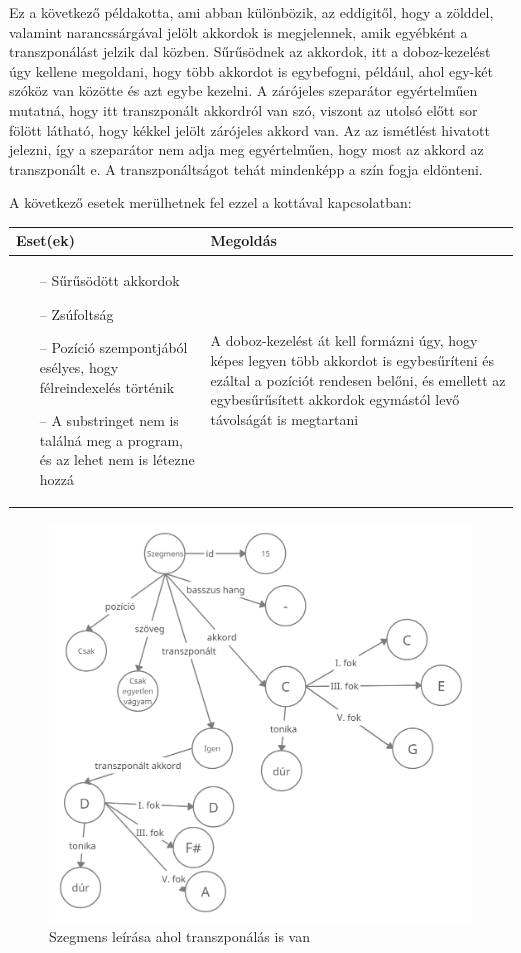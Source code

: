 Ez a következő példakotta, ami abban különbözik, az eddigitől, hogy a zölddel, valamint narancssárgával jelölt akkordok is megjelennek, amik egyébként a transzponálást jelzik dal közben. Sűrűsödnek az akkordok, itt a doboz-kezelést úgy kellene megoldani, hogy több akkordot is egybefogni, például, ahol egy-két szóköz van közötte és azt egybe kezelni. A zárójeles szeparátor egyértelműen mutatná, hogy itt transzponált akkordról van szó, viszont az utolsó előtt sor fölött látható, hogy kékkel jelölt zárójeles akkord van. Az az ismétlést hivatott jelezni, így a szeparátor nem adja meg egyértelműen, hogy most az akkord az transzponált e. A transzponáltságot tehát mindenképp a szín fogja eldönteni.

A következő esetek merülhetnek fel ezzel a kottával kapcsolatban:
\begin{center}
	\begin{tabular}{ |p{7cm}|p{7cm}| }
		\hline
		Eset(ek) & Megoldás\\ 
		\hline
		\begin{itemize}
			\item[--] Sűrűsödött akkordok
			\item[--] Zsúfoltság
			\item[--] Pozíció szempontjából esélyes, hogy félreindexelés történik
			\item[--] A substringet nem is találná meg a program, és az lehet nem is létezne hozzá
		\end{itemize} & A doboz-kezelést át kell formázni úgy, hogy képes legyen több akkordot is egybesűríteni és ezáltal a pozíciót rendesen belőni, és emellett az egybesűrűsített akkordok egymástól levő távolságát is megtartani \\ 
		\hline
	\end{tabular}
\end{center}
\newpage
\begin{figure}[h]
	\includegraphics[scale=0.29]{images/rdf_graph_5.png}
	\caption{Szegmens leírása ahol transzponálás is van}
	\label{fig:graph5}
\end{figure}
